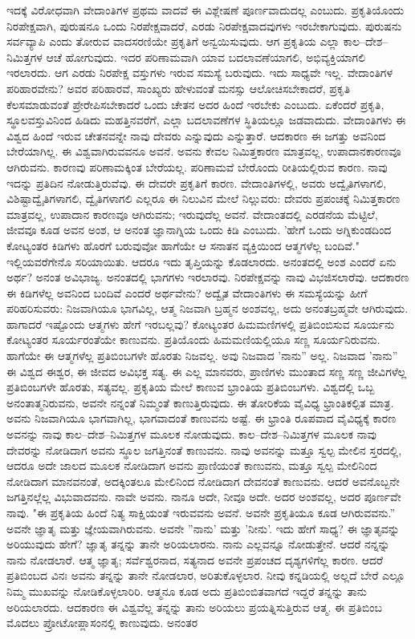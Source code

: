 ಇದಕ್ಕೆ ವಿರೋಧವಾಗಿ ವೇದಾಂತಿಗಳ ಪ್ರಥಮ ವಾದವೆ ಈ ವಿಶ್ಲೇಷಣೆ ಪೂರ್ಣವಾದುದಲ್ಲ ಎಂಬುದು. ಪ್ರಕೃತಿಯೊಂದು ನಿರಪೇಕ್ಷವಾಗಿ, ಪುರುಷನೂ ಒಂದು ನಿರಪೇಕ್ಷವಾದರೆ, ಎರಡು ನಿರಪೇಕ್ಷವಾದವುಗಳು ಇರಬೇಕಾಗುವುದು. ಪುರುಷನು ಸರ್ವವ್ಯಾಪಿ ಎಂದು ತೋರುವ ವಾದಸರಣಿಯೇ ಪ್ರಕೃತಿಗೆ ಅನ್ವಯಿಸುವುದು. ಆಗ ಪ್ರಕೃತಿಯ ಎಲ್ಲಾ ಕಾಲ–ದೇಶ–ನಿಮಿತ್ತಗಳ ಆಚೆ ಹೋಗುವುದು. ಇದರ ಪರಿಣಾಮವಾಗಿ ಯಾವ ಬದಲಾವಣೆಯಾಗಲಿ, ಅಭಿವ್ಯಕ್ತಿಯಾಗಲಿ ಇರಲಾರದು. ಆಗ ಎರಡು ನಿರಪೇಕ್ಷ ವಸ್ತುಗಳು ಇರುವ ಸಮಸ್ಯೆ ಬರುವುದು. ಇದು ಸಾಧ್ಯವೇ ಇಲ್ಲ. ವೇದಾಂತಿಗಳ ಪರಿಹಾರವೇನು? ಅವರ ಪರಿಹಾರವೆ, ಸಾಂಖ್ಯರು ಹೇಳುವಂತೆ ಮನಸ್ಸು ಆಲೋಚಿಸಬೇಕಾದರೆ, ಪ್ರಕೃತಿ ಕೆಲಸಮಾಡುವಂತೆ ಪ್ರೇರೇಪಿಸಬೇಕಾದರೆ ಒಂದು ಚೇತನ ಅದರ ಹಿಂದೆ ಇರಬೇಕು ಎಂಬುದು. ಏಕೆಂದರೆ ಪ್ರಕೃತಿ, ಸ್ಥೂಲವಸ್ತುವಿನಿಂದ ಹಿಡಿದು ಮಹತ್ತಿನವರೆಗೆ, ಎಲ್ಲಾ ಬದಲಾವಣೆಗಳ ಸ್ಥಿತಿಯಲ್ಲೂ ಜಡವಾದುದು. ವೇದಾಂತಿಗಳು ಈ ವಿಶ್ವದ ಹಿಂದೆ ಇರುವ ಚೇತನವನ್ನೇ ನಾವು ದೇವರು ಎನ್ನುವುದು ಎನ್ನುತ್ತಾರೆ. ಆದಕಾರಣ ಈ ಜಗತ್ತು ಅವನಿಂದ ಬೇರೆಯಾಗಿಲ್ಲ. ಈ ವಿಶ್ವವಾಗಿರುವವನೂ ಅವನೆ. ಅವನು ಕೇವಲ ನಿಮಿತ್ತಕಾರಣ ಮಾತ್ರವಲ್ಲ, ಉಪಾದಾನಕಾರಣವೂ ಆಗಿರುವನು. ಕಾರಣವು ಪರಿಣಾಮಕ್ಕಿಂತ ಬೇರೆಯಲ್ಲ. ಪರಿಣಾಮವೆ ಬೇರೊಂದು ರೀತಿಯಲ್ಲಿರುವ ಕಾರಣ. ನಾವು ಇದನ್ನು ಪ್ರತಿದಿನ ನೋಡುತ್ತಿರುವೆವು. ಈ ದೇವರೇ ಪ್ರಕೃತಿಗೆ ಕಾರಣ. ವೇದಾಂತಿಗಳಲ್ಲಿ, ಅವರು ಅದ್ವೈತಿಗಳಾಗಲಿ, ವಿಶಿಷ್ಟಾದ್ವೈತಿಗಳಾಗಲಿ, ದ್ವೈತಿಗಳಾಗಲಿ ಎಲ್ಲರೂ ಈ ನಿಲುವಿನ ಮೇಲೆ ನಿಲ್ಲುವರು: ದೇವರು ಪ್ರಪಂಚಕ್ಕೆ ನಿಮಿತ್ತಕಾರಣ ಮಾತ್ರವಲ್ಲ, ಉಪಾದಾನ ಕಾರಣವೂ ಆಗಿರುವನು; ಇರುವುದೆಲ್ಲ ಅವನೆ. ವೇದಾಂತದಲ್ಲಿ ಎರಡನೆಯ ಮೆಟ್ಟಿಲೆ, ಜೀವವೂ ಕೂಡ ಅವನ ಅಂಶ, ಆ ಅನಂತ ಜ್ಞಾನಾಗ್ನಿಯ ಒಂದು ಕಿಡಿ ಎಂಬುದು. 'ಹೇಗೆ ಒಂದು ಅಗ್ನಿಕುಂಡದಿಂದ ಕೋಟ್ಯಂತರ ಕಿಡಿಗಳು ಹೊರಗೆ ಬರುವುವೋ ಹಾಗೆಯೇ ಆ ಸನಾತನ ವ್ಯಕ್ತಿಯಿಂದ ಆತ್ಮಗಳೆಲ್ಲ ಬಂದಿವೆ." ಇಲ್ಲಿಯವರೆಗೇನೊ ಸರಿಯಾಯಿತು. ಆದರೂ ಇದು ತೃಪ್ತಿಯನ್ನು ಕೊಡಲಾರದು. ಅನಂತದಲ್ಲಿ ಅಂಶ ಎಂದರೆ ಏನು ಅರ್ಥ? ಅನಂತ ಅವಿಭಾಜ್ಯ. ಅನಂತದಲ್ಲಿ ಭಾಗಗಳು ಇರಲಾರವು. ನಿರಪೇಕ್ಷವನ್ನು ನಾವು ವಿಭಜಿಸಲಾರೆವು. ಆದಕಾರಣ ಈ ಕಿಡಿಗಳೆಲ್ಲ ಅವನಿಂದ ಬಂದಿವೆ ಎಂದರೆ ಅರ್ಥವೇನು? ಅದ್ವೈತ ವೇದಾಂತಿಗಳು ಈ ಸಮಸ್ಯೆಯನ್ನು ಹೀಗೆ ಪರಿಹರಿಸುವರು: ನಿಜವಾಗಿಯೂ ಭಾಗವಿಲ್ಲ, ಆತ್ಮ ನಿಜವಾಗಿ ಬ್ರಹ್ಮನ ಅಂಶವಲ್ಲ, ಅದು ಅನಂತಬ್ರಹ್ಮವೇ ಆಗಿರುವುದು. ಹಾಗಾದರೆ ಇಷ್ಟೊಂದು ಆತ್ಮಗಳು ಹೇಗೆ ಇರಬಲ್ಲವು? ಕೋಟ್ಯಂತರ ಹಿಮಮಣಿಗಳಲ್ಲಿ ಪ್ರತಿಬಿಂಬಿಸುವ ಸೂರ್ಯನು ಕೋಟ್ಯಂತರ ಸೂರ್ಯರಂತೆಯೇ ಕಾಣುವನು. ಪ್ರತಿಯೊಂದು ಹಿಮಮಣಿಯಲ್ಲಿಯೂ ಸಣ್ಣ ಸೂರ್ಯನಿರುವನು. ಹಾಗೆಯೇ ಈ ಆತ್ಮಗಳೆಲ್ಲ ಪ್ರತಿಬಿಂಬಗಳೇ ಹೊರತು ನಿಜವಲ್ಲ. ಅವು ನಿಜವಾದ 'ನಾನು'' ಅಲ್ಲ. ನಿಜವಾದ 'ನಾನು'' ಈ ವಿಶ್ವದ ಈಶ್ವರ, ಈ ಜೀವದ ಅವಿಭಕ್ತ ಸತ್ಯ. ಈ ಎಲ್ಲ ಮಾನವರು, ಪ್ರಾಣಿಗಳು ಮುಂತಾದ ಸಣ್ಣ ಸಣ್ಣ ಜೀವಿಗಳೆಲ್ಲ ಪ್ರತಿಬಿಂಬಗಳೇ ಹೊರತು, ಸತ್ಯವಲ್ಲ. ಪ್ರಕೃತಿಯ ಮೇಲೆ ಕಾಣುವ ಭ್ರಾಂತಿಯ ಪ್ರತಿಬಿಂಬಗಳು. ವಿಶ್ವದಲ್ಲಿ ಒಬ್ಬ ಅನಂತಾತ್ಮನಿರುವನು, ಅವನೇ ನನ್ನಂತೆ ನಿಮ್ಮಂತೆ ಕಾಣುತ್ತಿರುವುದು. ಈ ತೋರಿಕೆಯ ವೈವಿಧ್ಯ ಭ್ರಾಂತಿಕಲ್ಪಿತ ಮಾತ್ರ. ಅವನು ನಿಜವಾಗಿಯೂ ಭಾಗವಾಗಿಲ್ಲ, ಭಾಗವಾದಂತೆ ಕಾಣುವನು ಅಷ್ಟೆ. ಈ ಭ್ರಾಂತಿ ರೂಪವಾದ ವೈವಿಧ್ಯಕ್ಕೆ ಕಾರಣ ಅವನನ್ನು ನಾವು ಕಾಲ–ದೇಶ–ನಿಮಿತ್ತಗಳ ಮೂಲಕ ನೋಡುವುದು. ಕಾಲ–ದೇಶ–ನಿಮಿತ್ತಗಳ ಮೂಲಕ ನಾವು ದೇವರನ್ನು ನೋಡಿದಾಗ ಅವನು ಸ್ಥೂಲ ಜಗತ್ತಿನಂತೆ ಕಾಣುವನು. ನಾವು ಅವನನ್ನು ಮತ್ತೂ ಸ್ವಲ್ಪ ಮೇಲಿನ ಸ್ತರದಲ್ಲಿ, ಆದರೂ ಅದೇ ಜಾಲದ ಮೂಲಕ ನೋಡಿದಾಗ ಅವನು ಪ್ರಾಣಿಯಂತೆ ಕಾಣುವನು, ಮತ್ತೂ ಸ್ವಲ್ಪ ಮೇಲಿನಿಂದ ನೋಡಿದಾಗ ಮಾನವನಂತೆ, ಅದಕ್ಕಿಂತಲೂ ಮೇಲಿನಿಂದ ನೋಡಿದಾಗ ದೇವನಂತೆ ಕಾಣುವನು. ಆದರೆ ಅವನೊಬ್ಬನೇ ಜಗತ್ತಿನಲ್ಲೆಲ್ಲ ವಿಭುವಾದವನು. ನಾವೇ ಅವನು. ನಾನೂ ಅದೇ, ನೀವೂ ಅದೇ. ಅದರ ಅಂಶವಲ್ಲ, ಅದರ ಪೂರ್ಣವೇ ನಾವು. "ಈ ಪ್ರಕೃತಿಯ ಹಿಂದೆ ನಿತ್ಯ ಸಾಕ್ಷಿಯಂತೆ ಇರುವವನು ಅವನೆ. ಅವನೇ ಪ್ರಕೃತಿಯೂ ಕೂಡ ಆಗಿರುವವನು.” ಅವನೇ ಜ್ಞಾತೃ ಮತ್ತು ಜ್ಞೇಯವಾಗಿರುವನು. ಅವನೇ ''ನಾನು' ಮತ್ತು 'ನೀನು'. ಇದು ಹೇಗೆ ಸಾಧ್ಯ? ಈ ಜ್ಞಾತೃವನ್ನು ಅರಿಯುವುದು ಹೇಗೆ? ಜ್ಞಾತೃ ತನ್ನನ್ನು ತಾನೇ ಅರಿಯಲಾರನು. ನಾನು ಎಲ್ಲವನ್ನೂ ನೋಡುತ್ತೇನೆ. ಆದರೆ ನನ್ನನ್ನು ನಾನು ನೋಡಲಾರೆ. ಆತ್ಮ ಜ್ಞಾತೃ; ಸರ್ವೆಶ್ವರನಾದ, ಸತ್ಯನಾದ ಅವನೇ ಪ್ರಪಂಚದ ದೃಶ್ಯಗಳಿಗೆಲ್ಲ ಕಾರಣ. ಆದರೆ ಪ್ರತಿಬಿಂಬದ ವಿನಃ ಅವನು ತನ್ನನ್ನು ತಾನೇ ನೋಡಲಾರ, ಅರಿತುಕೊಳ್ಳಲಾರ. ನೀವು ಕನ್ನಡಿಯಲ್ಲಿ ಅಲ್ಲದೆ ಬೇರೆ ಎಲ್ಲೂ ನಿಮ್ಮ ಮುಖವನ್ನು ನೋಡಿಕೊಳ್ಳಲಾರಿರಿ. ಆತ್ಮನೂ ಕೂಡ ಅದು ಪ್ರತಿಬಿಂಬಿತವಾಗದೆ ಇದ್ದರೆ ತನ್ನನ್ನು ತಾನು ಅರಿಯಲಾರದು. ಆದಕಾರಣ ಈ ವಿಶ್ವವೆಲ್ಲ ತನ್ನನ್ನು ತಾನು ಅರಿಯಲು ಪ್ರಯತ್ನಿಸುತ್ತಿರುವ ಆತ್ಮ. ಈ ಪ್ರತಿಬಿಂಬ ಮೊದಲು ಪ್ರೋಟೋಪ್ಲಾಸಂನಲ್ಲಿ ಕಾಣುವುದು. ಅನಂತರ 